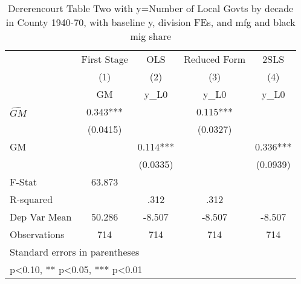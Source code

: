 \begin{table}[htbp]\centering
\def\sym#1{\ifmmode^{#1}\else\(^{#1}\)\fi}
\caption{Dererencourt Table Two with y=Number of Local Govts by decade in County 1940-70, with baseline y, division FEs, and mfg and black mig share}
\begin{tabular}{l*{4}{c}}
\toprule
                    & First Stage   &         OLS   &Reduced Form   &        2SLS   \\
                    &\multicolumn{1}{c}{(1)}&\multicolumn{1}{c}{(2)}&\multicolumn{1}{c}{(3)}&\multicolumn{1}{c}{(4)}\\
                    &\multicolumn{1}{c}{GM}&\multicolumn{1}{c}{y\_L0}&\multicolumn{1}{c}{y\_L0}&\multicolumn{1}{c}{y\_L0}\\
\midrule
$\hat{GM}$          &       0.343***&               &       0.115***&               \\
                    &    (0.0415)   &               &    (0.0327)   &               \\
\addlinespace
GM                  &               &       0.114***&               &       0.336***\\
                    &               &    (0.0335)   &               &    (0.0939)   \\
\midrule
F-Stat              &      63.873   &               &               &               \\
R-squared           &               &        .312   &        .312   &               \\
Dep Var Mean        &      50.286   &      -8.507   &      -8.507   &      -8.507   \\
Observations        &         714   &         714   &         714   &         714   \\
\bottomrule
\multicolumn{5}{l}{\footnotesize Standard errors in parentheses}\\
\multicolumn{5}{l}{\footnotesize * p<0.10, ** p<0.05, *** p<0.01}\\
\end{tabular}
\end{table}

